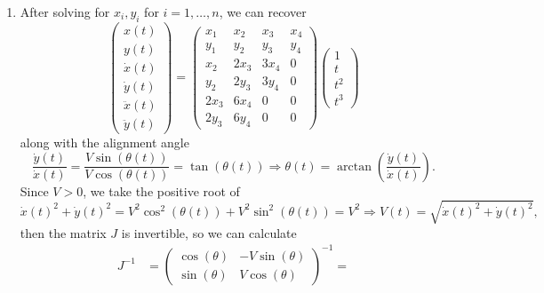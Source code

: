 \documentclass[12pt]{article}
\begin{document}
\begin{enumerate}
\begin{align*}
\begin{array}{c}
		-1
		\end{array}\right) =
		\left(\begin{array}{c}
		y(0) \\
		y(t_f) \\
		\dot y(0) \\
		\dot y(t_f)
		\end{array}\right)
	\end{align*}
	We cannot set $V(t_f) = 0$ because then $J$ would be singular at time $t_f$, and we could not recover the flat outputs from the virtual control inputs.
	\item After solving for $x_i,y_i$ for $i = 1,\ldots,n$, we can recover
	\[
		\left(\begin{array}{c}
		x(t) \\
		y(t) \\
		\dot x(t) \\
		\dot y(t) \\
		\ddot x(t) \\
		\ddot y(t)
		\end{array}\right) =
		\left(\begin{array}{cccc}
		x_1 & x_2 & x_3 & x_4 \\
		y_1 & y_2 & y_3 & y_4 \\
		x_2 & 2x_3 & 3x_4 & 0 \\
		y_2 & 2y_3 & 3y_4 & 0 \\
		2x_3 & 6x_4 & 0 & 0 \\
		2y_3 & 6y_4 & 0 & 0
		\end{array}\right)
		\left(\begin{array}{c}
		1 \\
		t \\
		t^2 \\
		t^3
		\end{array}\right)
	\]
	along with the alignment angle
	\[
		\frac{\dot y(t)}{\dot x(t)} = \frac{V\sin(\theta(t))}{V\cos(\theta(t))} = \tan(\theta(t)) \Rightarrow \theta(t) = \arctan\left(\frac{\dot y(t)}{\dot x(t)}\right).
	\]
	Since $V > 0$, we take the positive root of
	\[
		\dot x(t)^2 + \dot y(t)^2 = V^2\cos^2(\theta(t)) + V^2\sin^2(\theta(t)) = V^2 \Rightarrow V(t) = \sqrt{\dot x(t)^2 + \dot y(t)^2},
	\]
	then the matrix $J$ is invertible, so we can calculate
	\begin{align*}
		J^{-1} &= \left(\begin{array}{cc}
		\cos(\theta) & -V\sin(\theta) \\
		\sin(\theta) & V\cos(\theta)
		\end{array}\right)^{-1} = 

\end{align*}
\end{enumerate}
\end{document}
